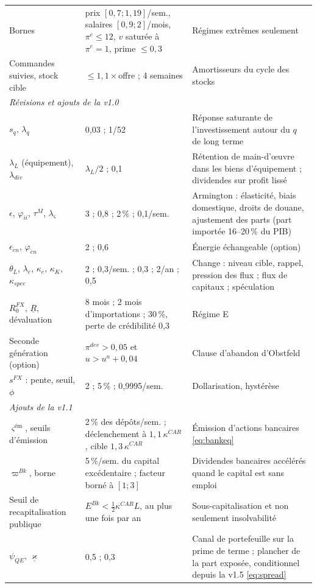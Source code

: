 \documentclass[11pt,a4paper]{article}
\begin{document}
\begin{center}
\begin{longtable}{p{4.2cm}p{3.0cm}p{7.6cm}}
Bornes & prix $[0{,}7;1{,}19]$/sem., salaires $[0{,}9;2]$/mois, $\pi^e\le12$, $v$ saturée à $\pi^e=1$, prime $\le0{,}3$ & Régimes extrêmes seulement\\
Commandes suivies, stock cible & $\le1{,}1\times$offre ; 4 semaines & Amortisseurs du cycle des stocks\\
\midrule
\multicolumn{3}{l}{\emph{Révisions et ajouts de la v1.0}}\\
$s_q$, $\lambda_q$ & 0,03 ; 1/52 & Réponse saturante de l'investissement autour du $q$ de long terme\\
$\lambda_L$ (équipement), $\lambda_{div}$ & $\lambda_L/2$ ; 0,1 & Rétention de main-d'œuvre dans les biens d'équipement ; dividendes sur profit lissé\\
$\epsilon$, $\varphi_{ii}$, $\tau^M$, $\lambda_\varsigma$ & 3 ; 0,8 ; 2\,\% ; 0,1/sem. & Armington : élasticité, biais domestique, droits de douane, ajustement des parts (part importée 16--20\,\% du PIB)\\
$\epsilon_{\acute{e}n}$, $\varphi_{\acute{e}n}$ & 2 ; 0,6 & Énergie échangeable (option)\\
$\theta_L$, $\lambda_e$, $\kappa_e$, $\kappa_K$, $\kappa_{spec}$ & 2 ; 0,3/sem. ; 0,3 ; 2/an ; 0,5 & Change : niveau cible, rappel, pression des flux ; flux de capitaux ; spéculation\\
$R^{FX}_0$, $\underline R$, dévaluation & 8 mois ; 2 mois d'importations ; 30\,\%, perte de crédibilité 0,3 & Régime E\\
Seconde génération (option) & $\pi^{dev}>0{,}05$ et $u>u^n+0{,}04$ & Clause d'abandon d'Obstfeld\\
$s^{FX}$ : pente, seuil, $\phi$ & 2 ; 5\,\% ; 0,9995/sem. & Dollarisation, hystérèse\\
\midrule
\multicolumn{3}{l}{\emph{Ajouts de la v1.1}}\\
$\varsigma^{\text{ém}}$, seuils d'émission & 2\,\% des dépôts/sem. ; déclenchement à $1{,}1\,\kappa^{CAR}$, cible $1{,}3\,\kappa^{CAR}$ & Émission d'actions bancaires \eqref{eq:bankeq}\\
$\varpi^{Bk}$, borne & 5\,\%/sem. du capital excédentaire ; facteur borné à $[1;3]$ & Dividendes bancaires accélérés quand le capital est sans emploi\\
Seuil de recapitalisation publique & $E^{Bk}<\tfrac12\kappa^{CAR}L$, au plus une fois par an & Sous-capitalisation et non seulement insolvabilité\\
$\psi_{QE}$, $\underline\varkappa$ & 0,5 ; 0,3 & Canal de portefeuille sur la prime de terme ; plancher de la part exposée, conditionnel depuis la v1.5 \eqref{eq:spread}\\

\end{longtable}
\end{center}
\end{document}

